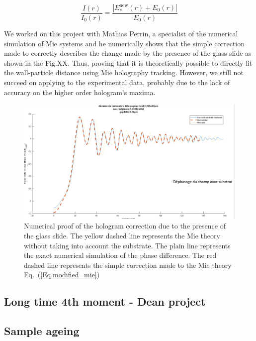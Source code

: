 \begin{equation}
	\frac{I(r)}{I_0(r)} = \frac{|E_s^\mathrm{new}(r) + E_0(r)|}{E_0(r)}
	\label{Eq.modified_mie}
\end{equation}

We worked on this project with Mathias Perrin, a specialist of the numerical simulation of Mie systems and he numerically shows that the simple correction made to correctly describes the change made by the presence of the glass slide as shown in the Fig.XX. Thus, proving that it is theoretically possible to directly fit the wall-particle distance using Mie holography tracking. However, we still not succeed on applying to the experimental data, probably due to the lack of accuracy on the higher order hologram's maxima.

\begin{figure}[H]
	\centering
	\includegraphics[scale=0.5]{02_body/chapter4/images/h_measurement/simulation_glass_correction.png}
	\caption{Numerical proof of the hologram correction due to the presence of the glass slide. The yellow dashed line represents the Mie theory without taking into account the substrate. The plain line represents the exact numerical simulation of the phase difference. The red dashed line represents the simple correction made to the Mie theory Eq.~(\ref{Eq.modified_mie})}
	\label{fig.glass_correction}
\end{figure}

\subsection{Long time 4th moment - Dean project}
\subsection{Sample ageing}

